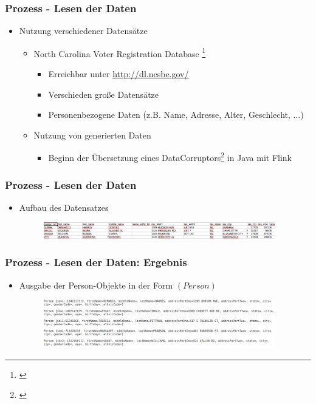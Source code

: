 \documentclass{beamer}
\begin{document}
    \begin{frame}
    		\frametitle{Prozess - Lesen der Daten}
    		\begin{itemize}
    			\item Nutzung verschiedener Datensätze
    			\begin{itemize}
    				\item North Carolina Voter Registration Database
    					\footnote{\cite{NorthCarolinaVoterRegistration}}
    				\begin{itemize}
    					\item Erreichbar unter \url{http://dl.ncsbe.gov/}
    					\item Verschieden große Datensätze
    					\item Personenbezogene Daten (z.B. Name, Adresse, Alter, Geschlecht, ...)
    				\end{itemize}
    				\item Nutzung von generierten Daten
    				\begin{itemize}
    					\item Beginn der Übersetzung eines DataCorruptors\footnote{\cite{DataCorruptor}} in Java mit Flink 
    				\end{itemize}	
    			\end{itemize} 
    		\end{itemize}
    \end{frame}
    
    \begin{frame}
    		\frametitle{Prozess - Lesen der Daten}
    		\begin{itemize}
    			\item Aufbau des Datensatzes
    			\begin{figure}
    				\includegraphics[width=0.95\textwidth]{graphics/voter_dataset.png}
    			\end{figure}
    		\end{itemize}
    \end{frame}
    
    \begin{frame}
    		\frametitle{Prozess - Lesen der Daten: Ergebnis}
    		\begin{itemize}
    				\item Ausgabe der Person-Objekte in der Form $(Person)$
    				\begin{figure}[H]
    					\includegraphics[width=0.95\textwidth]{graphics/persons.png}
    				\end{figure}
    		\end{itemize}
    \end{frame}
    
\end{document}
